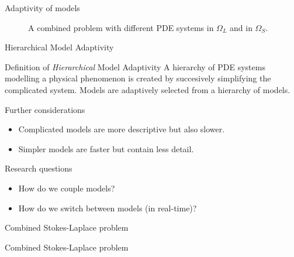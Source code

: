 \documentclass{beamer}
\theoremstyle{definition}
\begin{document}
\begin{frame}{Adaptivity of models}
\begin{figure}[H]
\begin{center}
	\end{center}
	\caption{A combined problem with different PDE systems in $\Omega_{L}$  and in $\Omega_{S}$.  }
	\label{fig_domain_adapt}
\end{figure}
\end{frame}

\begin{frame}{Hierarchical Model Adaptivity}
\centering
\begin{block}{Definition of \textit{Hierarchical} Model Adaptivity}
A hierarchy of PDE systems modelling a physical phenomenon is created by succesively simplifying the complicated system.	Models are adaptively selected from a hierarchy of models.  
\end{block}
\begin{block}{Further considerations}
		\begin{itemize}
			\item Complicated models are more descriptive but also slower.
			\item Simpler models are faster but contain less detail.
		\end{itemize}
\end{block}

\begin{block}{Research questions}
		\begin{itemize}
			\item How do we couple models?
			\item How do we switch between models (in real-time)?
		\end{itemize}
\end{block}
\end{frame}

\begin{frame}{Combined Stokes-Laplace problem}

\Huge{Combined Stokes-Laplace problem}


\end{frame}
\end{document}
